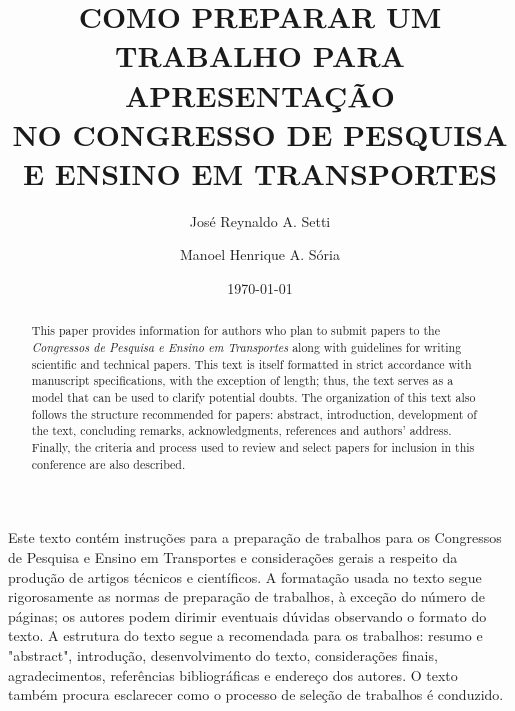 \documentclass{anpet}
\title{COMO PREPARAR UM TRABALHO PARA APRESENTAÇÃO \protect\\ NO CONGRESSO DE PESQUISA E ENSINO EM TRANSPORTES}
\author{José Reynaldo A. Setti}
\author{Manoel Henrique A. Sória}
\affil{Universidade de São Paulo \protect\\Escola de Engenharia de São Carlos}
\date{\today}
\begin{document}
\maketitle

\begin{resumo}
Este texto contém instruções para a preparação de trabalhos para os Congressos de Pesquisa e Ensino em Transportes e considerações gerais a respeito da produção de artigos técnicos e científicos. A formatação usada no texto segue rigorosamente as normas de preparação de trabalhos, à exceção do número de páginas; os autores podem dirimir eventuais dúvidas observando o formato do texto. A estrutura do texto segue a recomendada para os trabalhos: resumo e "abstract", introdução, desenvolvimento do texto, considerações finais, agradecimentos, referências bibliográficas e endereço dos autores. O texto também procura esclarecer como o processo de seleção de trabalhos é conduzido.
\end{resumo}

\begin{abstract}
This paper provides information for authors who plan to submit papers to the \textit{Congressos de Pesquisa e Ensino em Transportes} along with guidelines for writing scientific and technical papers. This text is itself formatted in strict accordance with manuscript specifications, with the exception of length; thus, the text serves as a model that can be used to clarify potential doubts. The organization of this text also follows the structure recommended for papers: abstract, introduction, development of the text, concluding remarks, acknowledgments, references and authors’ address. Finally, the criteria and process used to review and select papers for inclusion in this conference are also described.
\end{abstract}
\footnotesize

\normalsize
\end{document}
